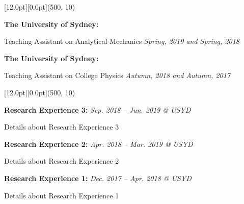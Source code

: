 \documentclass[12pt,a4paper]{report}
\begin{document}
    \begin{center}\begin{minipage}[t]{512pt}
        \colorbox{subtitlecolor}{\raisebox{0pt}[12.0pt][0.0pt]{\makebox(500, 10){
            \textcolor{white}{\ttfamily{}\selectfont{}}}}}\end{minipage}\end{center}
    \begin{center}
       \begin{minipage}[t]{460pt}
            {\textbf{The University of Sydney:}} \par
            \quad Teaching Assistant on Analytical Mechanics\hfill
            {\em{Spring, 2019 and Spring, 2018}}\par
            \vspace{4pt}\par
            {\textbf{The University of Sydney:}} \par
            \quad Teaching Assistant on College Physics\hfill
            {\em{Autumn, 2018 and Autumn, 2017}}\par
        \end{minipage}
    \end{center}
    \begin{center}\begin{minipage}[t]{512pt}
        \colorbox{subtitlecolor}{\raisebox{0pt}[12.0pt][0.0pt]{\makebox(500, 10){
            \textcolor{white}{\ttfamily{}\selectfont{}}}}}\end{minipage}\end{center}
    \begin{center}
        \begin{minipage}[t]{460pt}
            {\textbf{Research Experience 3:}} \hfill {\em{Sep. 2018 -- Jun. 2019 @ USYD}}\par
            \quad Details about Research Experience 3
            \vspace{4pt}\par
            {\textbf{Research Experience 2:}} \hfill {\em{Apr. 2018 -- Mar. 2019 @ USYD}}\par
            \quad Details about Research Experience 2
            \vspace{4pt}\par
            {\textbf{Research Experience 1:}} \hfill {\em{Dec. 2017 -- Apr. 2018 @ USYD}}\par
            \quad Details about Research Experience 1
        \end{minipage}
     \end{center}
\end{document}
